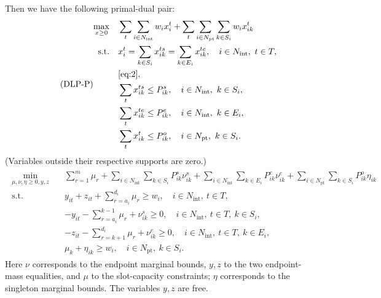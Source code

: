 \documentclass{article}
\begin{document}
Then we have the following primal-dual pair:
{
\begin{align}
\label{DLP-P}\tag{DLP-P}
\begin{split}
\max_{x\geq0}\quad
 &\sum_t\sum_{i\in N_{\mathrm{int}}}w_i x_i^t+\sum_t\sum_{i\in N_{\mathrm{pt}}}\sum_{k\in S_i}w_i x_{ik}^t\\
\text{s.t.}\quad
 &x_i^t=\sum_{k\in S_i}x_{ik}^{ts}=\sum_{k\in E_i}x_{ik}^{te},\quad i\in N_{\mathrm{int}},\ t\in T,\\
 &\eqref{eq:2},\\
 &\sum_t x_{ik}^{ts}\leq P_{ik}^s,\quad i\in N_{\mathrm{int}},\ k\in S_i,\\
 &\sum_t x_{ik}^{te}\leq P_{ik}^e,\quad i\in N_{\mathrm{int}},\ k\in E_i,\\
 &\sum_t x_{ik}^t\leq P^o_{ik},\quad i\in N_{\mathrm{pt}},\ k\in S_i.
\end{split}
\end{align}
(Variables outside their respective supports are zero.)
\begin{align}
\label{DLP-D}\tag{DLP-D}
\begin{split}
\min_{\mu,\nu,\eta\geq0,y,z}\quad
 &\sum_{r=1}^m\mu_r+\sum_{i\in N_{\mathrm{int}}}\sum_{k\in S_i}P_{ik}^s\nu_{ik}^s
 +\sum_{i\in N_{\mathrm{int}}}\sum_{k\in E_i}P_{ik}^e\nu_{ik}^e+\sum_{i\in N_{\mathrm{pt}}}\sum_{k\in S_i}P_{ik}^o\eta_{ik}\\
\text{s.t.}\quad
 &y_{it}+z_{it}+\sum_{r=a_i}^{d_i}\mu_r\geq w_i,\quad i\in N_{\mathrm{int}},\ t\in T,\\
 &-y_{it}-\sum_{r=a_i}^{k-1}\mu_r+\nu_{ik}^s\geq0,\quad i\in N_{\mathrm{int}},\ t\in T,\ k\in S_i,\\
 &-z_{it}-\sum_{r=k+1}^{d_i}\mu_r+\nu_{ik}^e\geq0,\quad i\in N_{\mathrm{int}},\ t\in T,\ k\in E_i,\\
 &\mu_k+\eta_{ik}\geq w_i,\quad i\in N_{\mathrm{pt}},\ k\in S_i.
\end{split}
\end{align}}
{Here $\nu$ corresponds to the endpoint marginal bounds, $y,z$ to the two endpoint-mass equalities, and $\mu$ to the slot-capacity constraints; $\eta$ corresponds to the singleton marginal bounds. The variables $y,z$ are free.}
\end{document}

